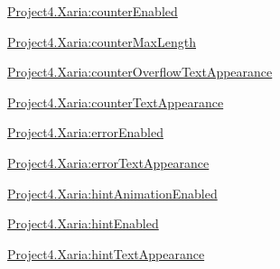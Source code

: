 {\ttfamily \hyperlink{classproject4_1_1xaria_1_1R_1_1styleable_abe72b67bbd7e17ba750c31e1e301e1e2}{Project4.\+Xaria\+:counter\+Enabled}}

{\ttfamily \hyperlink{classproject4_1_1xaria_1_1R_1_1styleable_a48eeaeeae4c8fc24f978d05e0930288c}{Project4.\+Xaria\+:counter\+Max\+Length}}

{\ttfamily \hyperlink{classproject4_1_1xaria_1_1R_1_1styleable_afcc440aa8b04e1782ae4bcdcab6d0d74}{Project4.\+Xaria\+:counter\+Overflow\+Text\+Appearance}}

{\ttfamily \hyperlink{classproject4_1_1xaria_1_1R_1_1styleable_a1317388c37206a92cac615b2e1bce472}{Project4.\+Xaria\+:counter\+Text\+Appearance}}

{\ttfamily \hyperlink{classproject4_1_1xaria_1_1R_1_1styleable_aa75e51a42b96d39550dcd078cc70a0d7}{Project4.\+Xaria\+:error\+Enabled}}

{\ttfamily \hyperlink{classproject4_1_1xaria_1_1R_1_1styleable_ad38bee143dd17467370cd16a83428514}{Project4.\+Xaria\+:error\+Text\+Appearance}}

{\ttfamily \hyperlink{classproject4_1_1xaria_1_1R_1_1styleable_a54817cff7e70ea97df2faf7653859bd4}{Project4.\+Xaria\+:hint\+Animation\+Enabled}}

{\ttfamily \hyperlink{classproject4_1_1xaria_1_1R_1_1styleable_ad51c0cb02e0a3966e40c64db946ea60a}{Project4.\+Xaria\+:hint\+Enabled}}

{\ttfamily \hyperlink{classproject4_1_1xaria_1_1R_1_1styleable_a309a9958fd85c366ec2a1e08ff0f0212}{Project4.\+Xaria\+:hint\+Text\+Appearance}}


